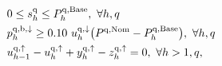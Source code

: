 \documentclass[conference]{IEEEtran}
\begin{document}
\begin{subequations}
\begin{align}
        \  & 0 \leq s_{h}^{\rm{q}} \leq P^{\rm{q},\rm{Base}}_{h}, \                                                                                                                                                   \forall{h,q}                                                                             \label{power:12q}                                                                                                                                                                                                                                       \\
        \  & p^{\rm{q},\rm{b}, \downarrow}_{h} \geq 0.10 \  u^{\rm{q},\downarrow}_{h} \big(P^{\rm{q},\rm{Nom}} - P^{\rm{q},\rm{Base}}_{h}\big), \                                                                                  \forall{h,q}                                                                             \label{power:14q}                                                                                                                                                                                                                               \\
        \  & u_{h-1}^{\rm{q},\uparrow} - u_{h}^{\rm{q},\uparrow} + y_{h}^{\rm{q},\uparrow} - z_{h}^{\rm{q},\uparrow} = 0, \    \forall{h>1,q},                                                                                                         \label{aux:1}                                                                                                                                                                                                                                                                                         \\

\end{align}
\end{subequations}
\end{document}
